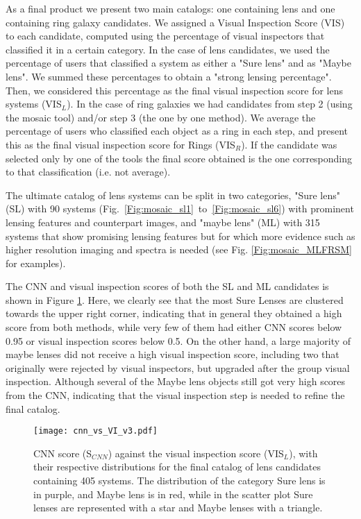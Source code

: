 \documentclass[tradiabstract,twocolumn]{aa}
\begin{document}
As a final product we present two main catalogs: one containing lens and one containing ring galaxy candidates. We assigned a Visual Inspection Score (VIS) to each candidate, computed using the percentage of visual inspectors that classified it in a certain category. In the case of lens candidates, we used the percentage of users that classified a system as either a "Sure lens" and as "Maybe lens". We summed these percentages to obtain a "strong lensing percentage". Then, we considered this percentage as the final visual inspection score for lens systems (VIS$_{L}$). In the case of ring galaxies we had candidates from step 2 (using the mosaic tool) and/or step 3 (the one by one method). We average the percentage of users who classified each object as a ring in each step, and present this as the final visual inspection score for Rings (VIS$_{R}$). If the candidate was selected only by one of the tools the final score obtained is the one corresponding to that classification (i.e. not average).

The ultimate catalog of lens systems can be split in two categories, "Sure lens" (SL) with 90 systems (Fig.~\ref{Fig:mosaic_sl1}~to~\ref{Fig:mosaic_sl6}) with prominent lensing features and counterpart images, and "maybe lens" (ML) with 315 systems that show promising lensing features but for which more evidence such as higher resolution imaging and spectra is needed (see Fig. \ref{Fig:mosaic_MLFRSM} for examples). 

The CNN and visual inspection scores of both the SL and ML candidates is shown in Figure \ref{Fig:cnn_vs_vi}. Here, we clearly see that the most Sure Lenses are clustered towards the upper right corner, indicating that in general they obtained a high score from both methods, while very few of them had either CNN scores below 0.95 or visual inspection scores below 0.5. On the other hand, a large majority of maybe lenses did not receive a high visual inspection score, including two that originally were rejected by visual inspectors, but upgraded after the group visual inspection. Although several of the Maybe lens objects still got very high scores from the CNN, indicating that the visual inspection step is needed to refine the final catalog.  


\begin{figure}
\centering
\texttt{[image: cnn\_vs\_VI\_v3.pdf]} 
\caption{CNN score (S$_{CNN}$) against the visual inspection score (VIS$_L$), with their respective distributions for the final catalog of lens candidates containing 405 systems. The distribution of the category Sure lens is in purple, and Maybe lens is in red, while in the scatter plot Sure lenses are represented with a star and Maybe lenses with a triangle.}
\label{Fig:cnn_vs_vi}
\end{figure}
\end{document}
